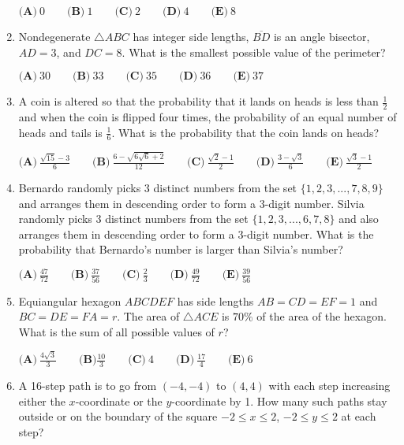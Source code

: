 \documentclass{article}
\begin{document}
\begin{enumerate}[label=\arabic*., itemsep=0.5em]
$\textbf{(A)}\ 0 \qquad \textbf{(B)}\ 1 \qquad \textbf{(C)}\ 2 \qquad \textbf{(D)}\ 4 \qquad \textbf{(E)}\ 8$\par \vspace{0.5em}\item Nondegenerate $\triangle ABC$ has integer side lengths, $\overline{BD}$ is an angle bisector, $AD = 3$, and $DC=8$. What is the smallest possible value of the perimeter?

$\textbf{(A)}\ 30 \qquad \textbf{(B)}\ 33 \qquad \textbf{(C)}\ 35 \qquad \textbf{(D)}\ 36 \qquad \textbf{(E)}\ 37$\par \vspace{0.5em}\item A coin is altered so that the probability that it lands on heads is less than $\frac{1}{2}$ and when the coin is flipped four times, the probability of an equal number of heads and tails is $\frac{1}{6}$. What is the probability that the coin lands on heads?

$\textbf{(A)}\ \frac{\sqrt{15}-3}{6} \qquad \textbf{(B)}\ \frac{6-\sqrt{6\sqrt{6}+2}}{12} \qquad \textbf{(C)}\ \frac{\sqrt{2}-1}{2} \qquad \textbf{(D)}\ \frac{3-\sqrt{3}}{6} \qquad \textbf{(E)}\ \frac{\sqrt{3}-1}{2}$\par \vspace{0.5em}\item Bernardo randomly picks 3 distinct numbers from the set $\{1,2,3,...,7,8,9\}$ and arranges them in descending order to form a 3-digit number. Silvia randomly picks 3 distinct numbers from the set $\{1,2,3,...,6,7,8\}$ and also arranges them in descending order to form a 3-digit number. What is the probability that Bernardo's number is larger than Silvia's number?

$\textbf{(A)}\ \frac{47}{72} \qquad \textbf{(B)}\ \frac{37}{56} \qquad \textbf{(C)}\ \frac{2}{3} \qquad \textbf{(D)}\ \frac{49}{72} \qquad \textbf{(E)}\ \frac{39}{56}$\par \vspace{0.5em}\item Equiangular hexagon $ABCDEF$ has side lengths $AB=CD=EF=1$ and $BC=DE=FA=r$. The area of $\triangle ACE$ is $70\%$ of the area of the hexagon. What is the sum of all possible values of $r$?

$\textbf{(A)}\ \frac{4\sqrt{3}}{3} \qquad \textbf{(B)} \frac{10}{3} \qquad \textbf{(C)}\ 4 \qquad \textbf{(D)}\ \frac{17}{4} \qquad \textbf{(E)}\ 6$\par \vspace{0.5em}\item A 16-step path is to go from $(-4,-4)$ to $(4,4)$ with each step increasing either the $x$-coordinate or the $y$-coordinate by 1. How many such paths stay outside or on the boundary of the square $-2 \le x \le 2$, $-2 \le y \le 2$ at each step?


\end{enumerate}
\end{document}
